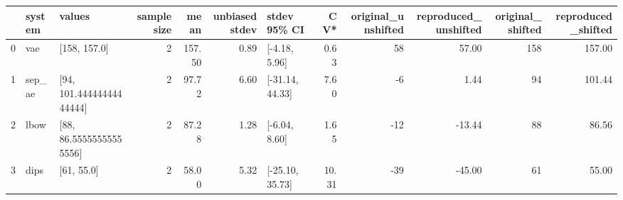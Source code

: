\begin{tabular}{lllrrrlrrrrr}
\toprule
 & system & values & sample size & mean & unbiased stdev & stdev 95\% CI & CV* & original\_unshifted & reproduced\_unshifted & original\_shifted & reproduced\_shifted \\
\midrule
0 & vae & [158, 157.0] & 2 & 157.50 & 0.89 & [-4.18, 5.96] & 0.63 & 58 & 57.00 & 158 & 157.00 \\
1 & sep\_ae & [94, 101.44444444444444] & 2 & 97.72 & 6.60 & [-31.14, 44.33] & 7.60 & -6 & 1.44 & 94 & 101.44 \\
2 & lbow & [88, 86.55555555555556] & 2 & 87.28 & 1.28 & [-6.04, 8.60] & 1.65 & -12 & -13.44 & 88 & 86.56 \\
3 & dips & [61, 55.0] & 2 & 58.00 & 5.32 & [-25.10, 35.73] & 10.31 & -39 & -45.00 & 61 & 55.00 \\
\bottomrule
\end{tabular}
